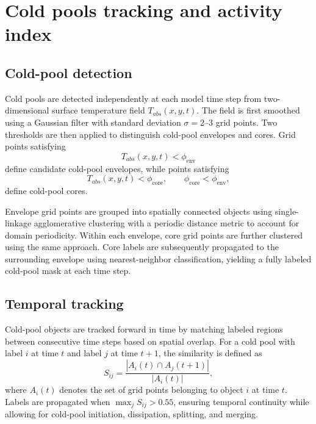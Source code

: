 \documentclass[11pt]{article}
\begin{document}
\section{Cold pools tracking and activity index}
\subsection*{Cold-pool detection}

Cold pools are detected independently at each model time step from two-dimensional surface temperature field
$T_{abs}(x,y,t)$. The field is first smoothed using a Gaussian filter with standard deviation
$\sigma = 2$--$3$ grid points. Two thresholds are then applied to distinguish cold-pool envelopes and
cores. Grid points satisfying
\begin{equation}
T_{abs}(x,y,t) < \phi_{\mathrm{env}}
\end{equation}
define candidate cold-pool envelopes, while points satisfying
\begin{equation}
T_{abs}(x,y,t) < \phi_{\mathrm{core}}, \qquad \phi_{\mathrm{core}} < \phi_{\mathrm{env}},
\end{equation}
define cold-pool cores.

Envelope grid points are grouped into spatially connected objects using single-linkage agglomerative
clustering with a periodic distance metric to account for domain periodicity. Within each envelope,
core grid points are further clustered using the same approach. Core labels are subsequently propagated
to the surrounding envelope using nearest-neighbor classification, yielding a fully labeled cold-pool
mask at each time step.


\subsection*{Temporal tracking}

Cold-pool objects are tracked forward in time by matching labeled regions between consecutive time
steps based on spatial overlap. For a cold pool with label $i$ at time $t$ and label $j$ at time $t+1$,
the similarity is defined as
\begin{equation}
S_{ij} = \frac{|A_i(t) \cap A_j(t+1)|}{|A_i(t)|},
\end{equation}
where $A_i(t)$ denotes the set of grid points belonging to object $i$ at time $t$. Labels are
propagated when $\max_j S_{ij} > 0.55$, ensuring temporal continuity while allowing for cold-pool
initiation, dissipation, splitting, and merging.
\end{document}
